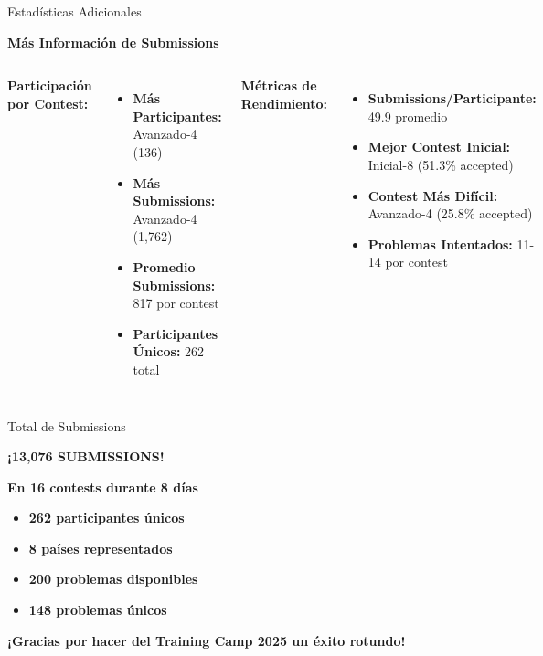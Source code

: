 \documentclass{beamer}
\begin{document}
\begin{frame}{Estadísticas Adicionales}
\begin{center}
\Large
\textbf{Más Información de Submissions}

\vspace{0.3cm}

\begin{columns}[t]
\textbf{Participación por Contest:}

\vspace{0.1cm}

\small
\begin{itemize}
\item \textbf{Más Participantes:} Avanzado-4 (136)
\item \textbf{Más Submissions:} Avanzado-4 (1,762)
\item \textbf{Promedio Submissions:} 817 por contest
\item \textbf{Participantes Únicos:} 262 total
\end{itemize}

\textbf{Métricas de Rendimiento:}

\vspace{0.1cm}

\small
\begin{itemize}
\item \textbf{Submissions/Participante:} 49.9 promedio
\item \textbf{Mejor Contest Inicial:} Inicial-8 (51.3\% accepted)
\item \textbf{Contest Más Difícil:} Avanzado-4 (25.8\% accepted)
\item \textbf{Problemas Intentados:} 11-14 por contest
\end{itemize}
\end{columns}


\end{center}
\end{frame}

\begin{frame}{Total de Submissions}
\begin{center}
\Huge
\textbf{¡13,076 SUBMISSIONS!}

\vspace{0.7cm}

\Large
\textbf{En 16 contests durante 8 días}

\vspace{0.3cm}

\normalsize
\begin{itemize}
\item \textbf{262 participantes únicos}
\item \textbf{8 países representados}
\item \textbf{200 problemas disponibles}
\item \textbf{148 problemas únicos}
\end{itemize}

\vspace{0.7cm}

\textbf{¡Gracias por hacer del Training Camp 2025 un éxito rotundo!}
\end{center}
\end{frame}
\end{document}
